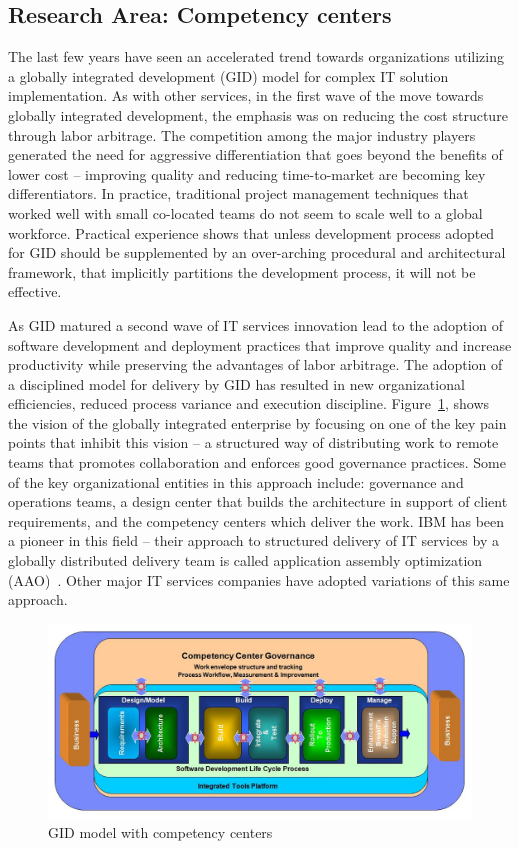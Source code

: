 \subsection{Research Area: Competency centers}
The last few years have seen an accelerated trend towards organizations utilizing a globally integrated development (GID) model for complex IT solution implementation. As with other services, in the first wave of the move towards globally integrated development, the emphasis was on reducing the cost structure through labor arbitrage.  The competition among the major industry players generated the need for aggressive differentiation that goes beyond the benefits of lower cost -- improving quality and reducing time-to-market are becoming key differentiators. In practice, traditional project management techniques that worked well with small co-located teams do not seem to scale well to a global workforce. Practical experience shows that unless development process adopted for GID should be supplemented by an over-arching procedural and architectural framework, that implicitly partitions the development process, it will not be effective.

As GID matured a second wave of IT services innovation lead to the adoption of software development and deployment practices that improve quality and increase productivity while preserving the advantages of labor arbitrage.  The adoption of a disciplined model for delivery by GID has resulted in new organizational efficiencies, reduced process variance and execution discipline. Figure~\ref{glofig1}, shows the vision of the globally integrated enterprise by focusing on one of the key pain points that inhibit this vision -- a structured way of distributing work to remote teams that promotes collaboration and enforces good governance practices.  Some of the key organizational entities in this approach include: governance and operations teams, a design center that builds the architecture in support of client requirements, and the competency centers which deliver the work. IBM has been a pioneer in this field -- their approach to structured delivery of IT services by a globally distributed delivery team is called application assembly optimization (AAO)~\cite{gloaao}. Other major IT services companies have adopted variations of this same approach.

\begin{figure}[H]
\includegraphics[scale=0.2]{figs/glocomp.jpg}
\caption{GID model with competency centers}
\label{glofig1}
\end{figure}

